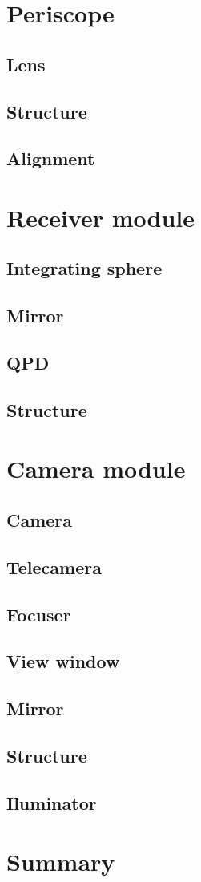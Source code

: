 \section{Periscope}
\subsection{Lens}
\subsection{Structure}
\subsection{Alignment}

\section{Receiver module}
\subsection{Integrating sphere}
\subsection{Mirror}
\subsection{QPD}
\subsection{Structure}

\section{Camera module}
\subsection{Camera}
\subsection{Telecamera}
\subsection{Focuser}
\subsection{View window}
\subsection{Mirror}
\subsection{Structure}
\subsection{Iluminator}

\section{Summary}
